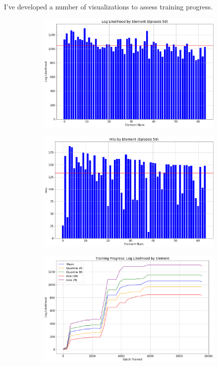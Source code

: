I've developed a number of visualizations to assess training progress.
\newcommand{\subfigwidth}{0.5}
\begin{figure}[h]
\begin{subfigure}[t]{\subfigwidth\textwidth}
\centering
\includegraphics[width=\linewidth]{../figs/search_known/unperturbed/log_like.png}
\end{subfigure}
\hfill
\begin{subfigure}[t]{\subfigwidth\textwidth}
\centering
\includegraphics[width=\linewidth]{../figs/search_known/unperturbed/hits.png}
\end{subfigure}
\medskip
\begin{subfigure}[t]{\subfigwidth\textwidth}
\centering
\includegraphics[width=\linewidth]{../figs/search_known/unperturbed/learning_curve_log_like.png}

\end{subfigure}
\end{figure}
